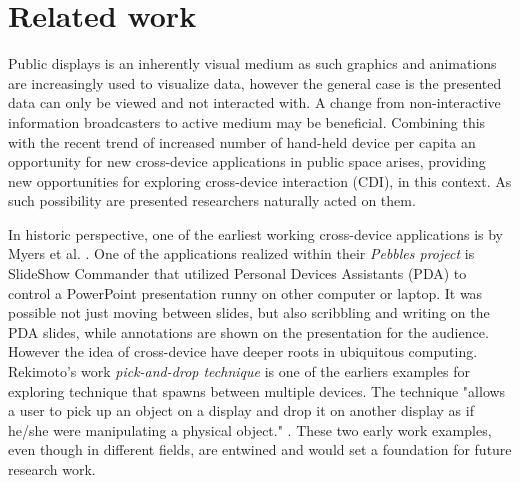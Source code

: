 \section{Related work} \label{sec:relatedwork}

Public displays is an inherently visual medium as such graphics and animations are increasingly used to visualize data, however the general case is the presented data can only be viewed and not interacted with. A change from non-interactive information broadcasters to active medium may be beneficial. 
Combining this with the recent trend of increased number of hand-held device per capita an opportunity for new cross-device applications in public space arises, providing new opportunities for exploring cross-device interaction (CDI), in this context.
As such possibility are presented researchers naturally acted on them.

In historic perspective, one of the earliest working cross-device applications is by Myers et al. \cite{Myers:2001}. 
One of the applications realized within their \emph{Pebbles project} is SlideShow Commander that utilized Personal Devices Assistants (PDA) to control a PowerPoint presentation runny on other computer or laptop.
It was possible not just moving between slides, but also scribbling and writing on the PDA slides, while annotations are shown on the presentation for the audience. 
However the idea of cross-device have deeper roots in ubiquitous computing. Rekimoto's work \emph{pick-and-drop technique} is one of the earliers examples for exploring technique that spawns between multiple devices. The technique "allows a user to pick up an object on a display and drop it on another display as if he/she were manipulating a physical object." \cite{Rekimoto:1997}. 
These two early work examples, even though in different fields, are entwined and would set a foundation for future research work.\\

